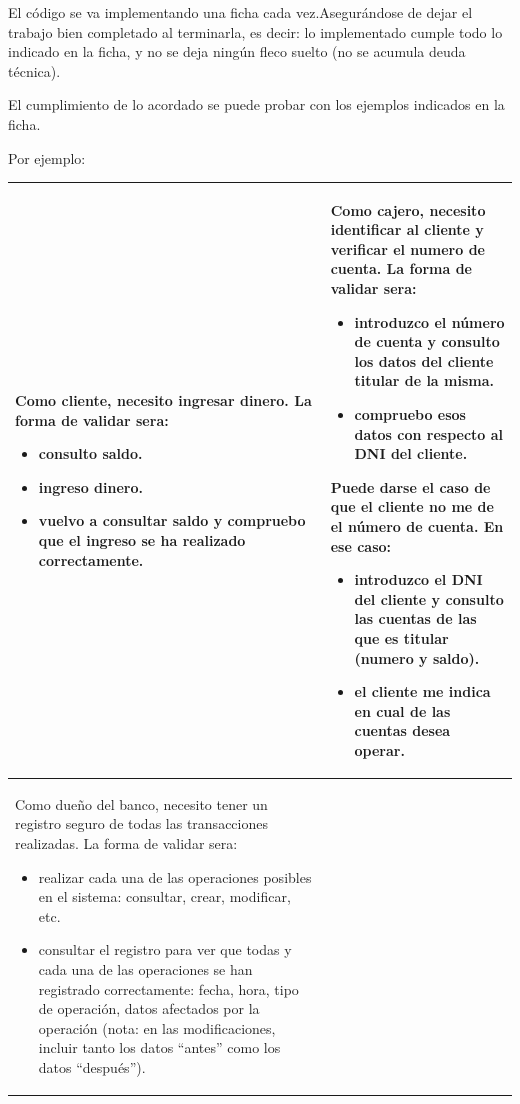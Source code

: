 \documentclass[spanish,12pt,a4paper,final,oneside]{book}
\begin{document}
El código se va implementando una ficha cada vez.Asegurándose de dejar el trabajo bien completado al terminarla, es decir: lo implementado cumple todo lo indicado en la ficha, y no se deja ningún fleco suelto (no se acumula deuda técnica).

El cumplimiento de lo acordado se puede probar con los ejemplos indicados en la ficha.

Por ejemplo:

\def\arraystretch{2}
\begin{longtable}{|p{7cm}|p{7cm}|}

\hline

Como cliente, necesito ingresar dinero.
\newline \newline
La forma de validar sera:
\begin{itemize}
\item consulto saldo.                                
\item ingreso dinero.
\item vuelvo a consultar saldo y compruebo que el ingreso se ha realizado correctamente.
\end{itemize}

&
                
Como cajero, necesito identificar al cliente y verificar el numero de cuenta. 
\newline \newline
La forma de validar sera:
\begin{itemize}
\item introduzco el número de cuenta y consulto los datos del cliente titular de la misma.
\item compruebo esos datos con respecto al DNI del cliente.
\end{itemize}
Puede darse el caso de que el cliente no me de el número de cuenta. En ese caso:
\begin{itemize}
\item introduzco el DNI del cliente y consulto las cuentas de las que es titular (numero y saldo).
\item el cliente me indica en cual de las cuentas desea operar.
\end{itemize}

\\ \hline
                        
                
Como dueño del banco, necesito tener un registro seguro de todas las transacciones realizadas.
\newline \newline
 La forma de validar sera:                
\begin{itemize}
\item realizar cada una de las operaciones posibles en el sistema: consultar, crear, modificar, etc.
\item consultar el registro para ver que todas y cada una de las operaciones se han registrado correctamente: fecha, hora, tipo de operación, datos afectados por la operación (nota: en las modificaciones, incluir tanto los datos ``antes'' como los datos ``después'').
\end{itemize}
                        

\end{longtable}
\end{document}
